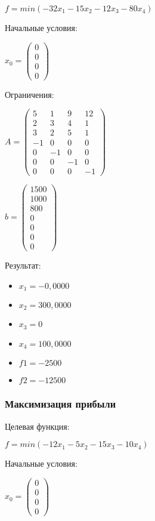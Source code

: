 $f = min (-32x_1-15x_2-12x_3-80x_4)$

Начальные условия:

$x_0 =
\begin{pmatrix}
  0 \\
  0 \\
  0 \\
  0
\end{pmatrix}$

Ограничения:

$A =
\begin{pmatrix}
  5 & 1 & 9 & 12 \\
  2 & 3 & 4 & 1 \\
  3 & 2 & 5 & 1 \\
  -1& 0 & 0 & 0 \\
  0 &-1 & 0 & 0 \\
  0 & 0 &-1 & 0 \\
  0 & 0 & 0 & -1
\end{pmatrix}$

$b =
\begin{pmatrix}
  1500 \\
  1000 \\
  800 \\
  0 \\
  0 \\
  0 \\
  0
\end{pmatrix}$



Результат:
\begin{itemize}
\item $x_1 = -0,0000$
\item $x_2 = 300,0000$
\item $x_3 = 0$
\item $x_4 = 100,0000$
\item $f1 = -2500$
\item $f2 = -12500$
\end{itemize}

\subsubsection{Максимизация прибыли}

Целевая функция:

$f = min (-12x_1-5x_2-15x_3-10x_4)$

Начальные условия:

$x_0 =
\begin{pmatrix}
  0 \\
  0 \\
  0 \\
  0
\end{pmatrix}$

